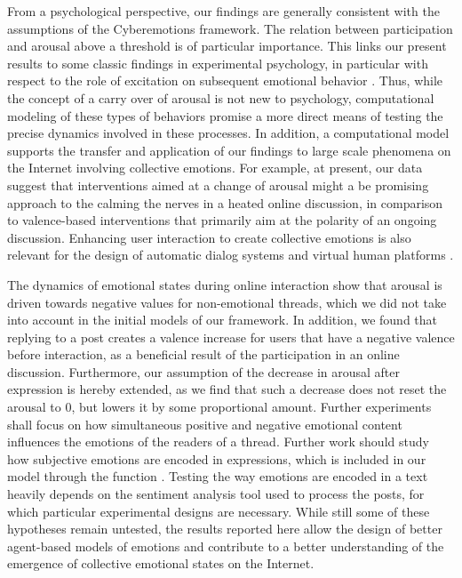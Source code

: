 \documentclass[nologo,url,11pt,a4paper]{ETHpaper}
\begin{document}
From a psychological perspective, our findings are generally consistent with
the assumptions of the Cyberemotions framework.  The relation between
participation and arousal above a threshold is of particular importance. This
links our present results to some classic findings in experimental psychology,
in particular with respect to the role of excitation on subsequent emotional
behavior \cite{Cantor1974,Cummins2012,Turnbull2002,Zillmann1974}. Thus, while
the concept of a carry over of arousal is not new to psychology, computational
modeling of these types of behaviors promise a more direct means of testing
the precise dynamics involved in these processes.  In addition, a
computational model supports the transfer and application of our
findings to large scale phenomena on the Internet involving collective
emotions. For example, at present, our data suggest that interventions aimed
at a change of arousal might a be promising approach to the calming the nerves
in a heated online discussion, in comparison to  valence-based interventions
that primarily aim at the polarity of an ongoing discussion. Enhancing
user interaction to create collective emotions is also relevant for the design
of automatic dialog systems \cite{Rank2013} and virtual human platforms
\cite{Ahn2012}.


The dynamics of emotional states during online interaction show that arousal
is driven towards negative values for non-emotional threads, which we did not
take into account in the initial models of our framework. In addition, we
found that replying to a post creates a valence increase for users that have a
negative valence before interaction, as a beneficial result of the
participation in an online discussion. Furthermore, our assumption of the
decrease in arousal after expression is hereby extended, as we find that such
a decrease does not reset the arousal to 0, but lowers it by some proportional
amount. Further experiments shall focus on how simultaneous positive and
negative emotional content influences the emotions of the readers of a thread.
Further work should study how subjective emotions are encoded in expressions,
which is included in our model through the function 
. 
Testing the way emotions are
encoded in a text heavily depends on the sentiment analysis tool used to
process the posts, for which particular experimental designs are necessary.
While still some of these hypotheses remain untested, the results reported here allow the design of better agent-based models of emotions and contribute to a better understanding of the emergence of collective emotional states on the Internet.
\end{document}
